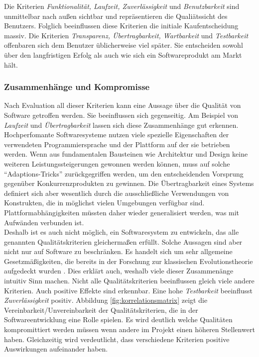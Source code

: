 Die Kriterien \textit{Funktionalität, Laufzeit, Zuverlässigkeit} und \textit{Benutzbarkeit} sind unmittelbar nach außen sichtbar und repräsentieren die Qualiätssicht des Benutzers. Folglich beeinflussen diese Kriterien die initiale Kaufentscheidung massiv. Die Kriterien \textit{Transparenz, Übertragbarkeit, Wartbarkeit} und \textit{Testbarkeit} offenbaren sich dem Benutzer üblicherweise viel später. Sie entscheiden sowohl über den langfristigen Erfolg als auch wie sich ein Softwareprodukt am Markt hält.

\subsubsection{Zusammenhänge und Kompromisse} 
Nach Evaluation all dieser Kriterien kann eine Aussage über die Qualität von Software getroffen werden. Sie beeinflussen sich gegenseitig. Am Beispiel von \textit{Laufzeit} und \textit{Übertragbarkeit} lassen sich diese Zusammenhänge gut erkennen. Hochperfomante Softwaresysteme nutzen viele spezielle Eigenschaften der verwendeten Programmiersprache und der Plattform auf der sie betrieben werden. Wenn aus fundamentalen Bausteinen wie Architektur und Design keine weiteren Leistungssteigerungen gewonnen werden können, muss auf solche ``Adaptions-Tricks'' zurückgegriffen werden, um den entscheidenden Vorsprung gegenüber Konkurrenzprodukten zu gewinnen. Die Übertragbarkeit eines Systems definiert sich aber wesentlich durch die ausschließliche Verwendungen von Konstrukten, die in möglichst vielen Umgebungen verfügbar sind. Plattformabhängigkeiten müssten daher wieder generalisiert werden, was mit Aufwänden verbunden ist.\\
Deshalb ist es auch nicht möglich, ein Softwaresystem zu entwickeln, das alle genannten Qualitätskriterien gleichermaßen erfüllt. Solche Aussagen sind aber nicht nur auf Software zu beschränken. Es handelt sich um sehr allgemeine Gesetzmäßigkeiten, die bereits in der Forschung zur klassischen Evolutionstheorie aufgedeckt wurden \cite{hoffmann_software-qualitat_2013}. Dies erklärt auch, weshalb viele dieser Zusammenänge intuitiv Sinn machen. Nicht alle Qualitätskriterien beeinflussen gleich viele andere Kriterien. Auch positive Effekte sind erkennbar. Eine hohe \textit{Testbarkeit} beeinflusst \textit{Zuverlässigkeit} positiv. Abbildung \ref{fig:korrelationsmatrix} zeigt die Vereinbarkeit/Unvereinbarkeit der Qualitätskriterien, die in der Softwareentwicklung eine Rolle spielen. Es wird deutlich welche Qualitäten kompromittiert werden müssen wenn andere im Projekt einen höheren Stellenwert haben. Gleichzeitig wird verdeutlicht, dass verschiedene Kriterien positive Auswirkungen aufeinander haben.

